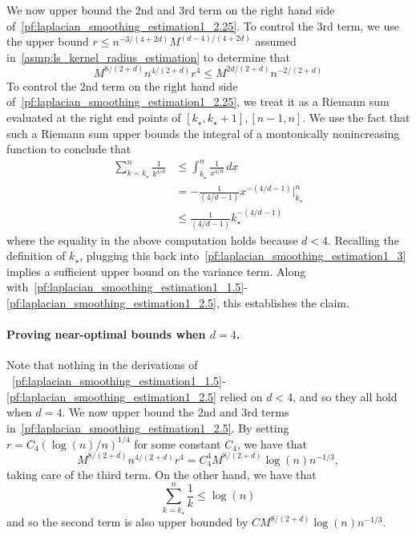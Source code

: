 \documentclass{article}
\newcommand{\1}{\mathbf{1}}
\theoremstyle{alden}
\theoremstyle{aldenthm}
\theoremstyle{definition}
\theoremstyle{remark}
\begin{document}
We now upper bound the 2nd and 3rd term on the right hand side of~\eqref{pf:laplacian_smoothing_estimation1_2.25}. To control the 3rd term, we use the upper bound $r \leq n^{-3/(4 + 2d)} M^{(d - 4)/(4 + 2d)}$ assumed in~\ref{asmp:ls_kernel_radius_estimation} to determine that
\begin{equation}
\label{pf:laplacian_smoothing_estimation1_3}
M^{8/(2 + d)}n^{4/(2 + d)}r^4 \leq M^{2d/(2 + d)}n^{-2/(2 + d)} 
\end{equation}
To control the 2nd term on the right hand side of~\eqref{pf:laplacian_smoothing_estimation1_2.25}, we treat it as a Riemann sum evaluated at the right end points of $[k_{\star},k_{\star} + 1], [n - 1,n]$. We use the fact that such a Riemann sum upper bounds the integral of a montonically nonincreasing function to conclude that
\begin{equation}
\label{pf:laplacian_smoothing_estimation1_4}
\begin{aligned}
\sum_{k = k_{\star}}^{n} \frac{1}{k^{4/d}} & \leq \int_{k_{\star}}^{n} \frac{1}{x^{4/d}} \,dx \\
& = - \frac{1}{(4/d - 1)} x^{-(4/d - 1)} \Big|_{k_{\star}}^{n} \\
& \leq \frac{1}{(4/d - 1)} k_{\star}^{-(4/d - 1)}
\end{aligned}
\end{equation}
where the equality in the above computation holds because $d < 4$. Recalling the definition of $k_{\star}$, plugging this back into~\eqref{pf:laplacian_smoothing_estimation1_3} implies a sufficient upper bound on the variance term. Along with~\eqref{pf:laplacian_smoothing_estimation1_1.5}-\eqref{pf:laplacian_smoothing_estimation1_2.5}, this establishes the claim.

\paragraph{Proving near-optimal bounds when $d = 4$.}
Note that nothing in the derivations of  ~\eqref{pf:laplacian_smoothing_estimation1_1.5}-\eqref{pf:laplacian_smoothing_estimation1_2.5} relied on $d < 4$, and so they all hold when $d = 4$. We now upper bound the 2nd and 3rd terms in~\eqref{pf:laplacian_smoothing_estimation1_2.5}. By setting $r = C_4(\log(n)/n)^{1/4}$ for some constant $C_4$, we have that
\begin{equation*}
M^{8/(2+d)}n^{4/(2+d)}r^4 = C_4^4 M^{8/(2+d)} \log(n) n^{-1/3},
\end{equation*}
taking care of the third term. On the other hand, we have that
\begin{equation*}
\sum_{k = k_{\star}}^{n} \frac{1}{k} \leq \log(n)
\end{equation*}
and so the second term is also upper bounded by $C M^{8/(2+d)} \log(n) n^{-1/3}$.
\end{document}
